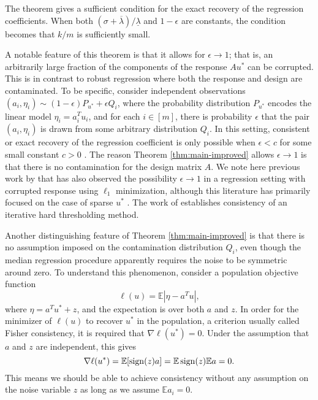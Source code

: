 The theorem gives a sufficient condition for the exact recovery of the regression coefficients. When both $(\sigma+\overline{\lambda})/\underline{\lambda}$ and $1-\epsilon$ are constants, the condition becomes that $k/m$ is sufficiently small.

A notable feature of this theorem is that it allows for $\epsilon \rightarrow 1$; that is, an arbitrarily large fraction of the components of the response $Au^*$ can be corrupted. This is in contrast to robust regression where both the response and design are contaminated. To be specific, consider independent observations $(a_i,\eta_i)\sim (1-\epsilon)P_{u^*}+\epsilon Q_i$, where the probability distribution $P_{u^*}$ encodes the linear model $\eta_i=a_i^Tu_i$, and for each $i\in[m]$, there is probability $\epsilon$ that the pair $(a_i,\eta_i)$ is drawn from some arbitrary distribution $Q_i$. In this setting, consistent or exact recovery of the regression coefficient is only possible when $\epsilon<c$ for some small constant $c>0$ \citep{gao2020}. The reason Theorem \ref{thm:main-improved} allows $\epsilon\rightarrow 1$ is that there is no contamination for the design matrix $A$. We note here previous work by that has also observed the possibility $\epsilon\to 1$ in
a regression setting with corrupted response using $\ell_1$ minimization, although this literature has primarily focused on the case of sparse $u^*$ \citep{wright,nguyen1,nguyen2}. The work of \cite{bhatia} establishes consistency of 
an iterative hard thresholding method.

Another distinguishing feature of Theorem \ref{thm:main-improved} is that there is no assumption imposed on the contamination distribution $Q_i$, even though the median regression procedure apparently requires the noise to be symmetric around zero. To understand this phenomenon, consider a population objective function
$$\ell(u)=\mathbb{E}|\eta - a^Tu|,$$
where $\eta=a^Tu^*+z$, and the expectation is over both $a$ and $z$. In order for the minimizer of $\ell(u)$ to recover $u^*$ in the population, a criterion usually called Fisher consistency, it is required that $\nabla\ell(u^*)=0$. Under the assumption that $a$ and $z$ are independent, this gives
\begin{equation}
\nabla\ell(u^*)=\mathbb{E}[\sgn(z)a]=\mathbb{E}\sgn(z)\mathbb{E}a=0. \label{eq:pop-insight}
\end{equation}
This means we should be able to achieve consistency without any assumption on the noise variable $z$ as long as we assume $\mathbb{E}a_i=0$.

